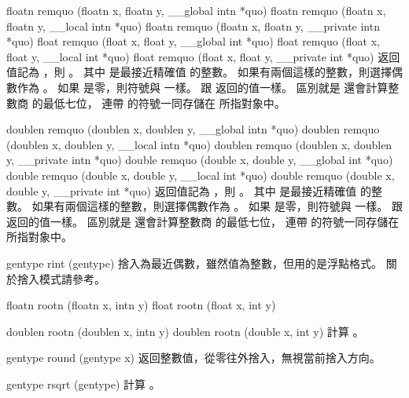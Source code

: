 floatn remquo (floatn x,
	floatn y,
	__global intn *quo)
floatn remquo (floatn x,
	floatn y,
	__local intn *quo)
floatn remquo (floatn x,
	floatn y,
	__private intn *quo)
float remquo (float x,
	float y,
	__global int *quo)
float remquo (float x,
	float y,
	__local int *quo)
float remquo (float x,
	float y,
	__private int *quo)
\stopbuffer
{}
返回值記為 ，則 。
其中  是最接近精確值  的整數。
如果有兩個這樣的整數，則選擇偶數作為 。
如果  是零，則符號與  一樣。
 跟  返回的值一樣。
區別就是  還會計算整數商  的最低七位，
連帶  的符號一同存儲在  所指對象中。
\stopbuffer

doublen remquo (doublen x,
	doublen y,
	__global intn *quo)
doublen remquo (doublen x,
	doublen y,
	__local intn *quo)
doublen remquo (doublen x,
	doublen y,
	__private intn *quo)
double remquo (double x,
	double y,
	__global int *quo)
double remquo (double x,
	double y,
	__local int *quo)
double remquo (double x,
	double y,
	__private int *quo)
\stopbuffer
{}
返回值記為 ，則 。
其中  是最接近精確值  的整數。
如果有兩個這樣的整數，則選擇偶數作為 。
如果  是零，則符號與  一樣。
 跟  返回的值一樣。
區別就是  還會計算整數商  的最低七位，
連帶  的符號一同存儲在  所指對象中。
\stopbuffer

gentype rint (gentype)
\stopbuffer
{}
捨入為最近偶數，雖然值為整數，但用的是浮點格式。
關於捨入模式請參考。
\stopbuffer

floatn rootn (floatn x, intn y)
float rootn (float x, int y)

doublen rootn (doublen x, intn y)
doublen rootn (double x, int y)
\stopbuffer
{}
計算 。
\stopbuffer

gentype round (gentype x)
\stopbuffer
{}
返回整數值，從零往外捨入，無視當前捨入方向。
\stopbuffer

gentype rsqrt (gentype)
\stopbuffer
{}
計算 。
\stopbuffer


